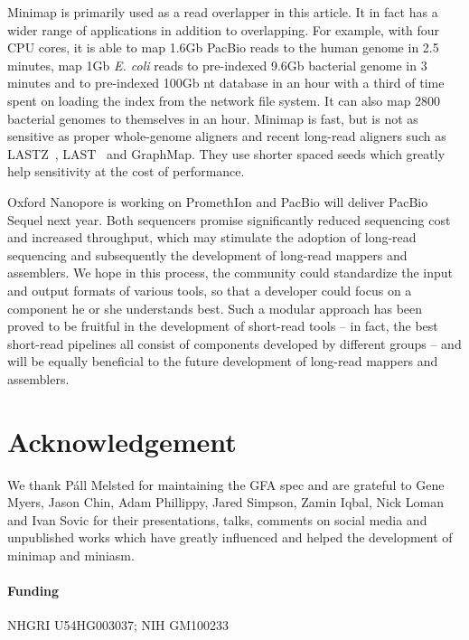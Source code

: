 \documentclass{bioinfo}
\begin{document}
Minimap is primarily used as a read overlapper in this article. It in fact has a
wider range of applications in addition to overlapping.  For example, with four
CPU cores, it is able to map 1.6Gb PacBio reads to the human genome in 2.5
minutes, map 1Gb {\it E. coli} reads to pre-indexed 9.6Gb bacterial genome in 3
minutes and to pre-indexed 100Gb nt database in an hour with a third of time
spent on loading the index from the network file system. It can also map 2800
bacterial genomes to themselves in an hour. Minimap is fast, but is not as
sensitive as proper whole-genome aligners and recent long-read aligners such as
LASTZ~\citep{harris:2007aa}, LAST~\citep{Kiebasa:2011aa} and GraphMap. They use
shorter spaced seeds which greatly help sensitivity at the cost of performance.

Oxford Nanopore is working on PromethIon and PacBio will deliver PacBio Sequel
next year. Both sequencers promise significantly reduced sequencing cost and
increased throughput, which may stimulate the adoption of long-read sequencing
and subsequently the development of long-read mappers and assemblers. We hope
in this process, the community could standardize the input and output formats
of various tools, so that a developer could focus on a component he or she
understands best. Such a modular approach has been proved to be fruitful in the
development of short-read tools -- in fact, the best short-read pipelines all
consist of components developed by different groups -- and will be equally
beneficial to the future development of long-read mappers and assemblers.

\section*{Acknowledgement}

We thank P\'all Melsted for maintaining the GFA spec and are grateful to Gene
Myers, Jason Chin, Adam Phillippy, Jared Simpson, Zamin Iqbal, Nick Loman and
Ivan Sovic for their presentations, talks, comments on social media and
unpublished works which have greatly influenced and helped the development of
minimap and miniasm.

\paragraph{Funding\textcolon} NHGRI U54HG003037; NIH GM100233


\end{document}
